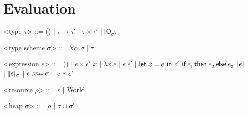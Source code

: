 \chapter{Evaluation} \label{chapter:evaluation}


\begin{grammar}

  <type $\tau$> ::= () | $\tau \rightarrow \tau'$ | $\tau \times \tau'$ | $\textsf{IO}_\sigma \tau$
  
  <type scheme $\sigma$> ::= $\forall \alpha . \sigma$ | $\tau$

  <expression $e$> ::= () | $e \times e'$
  \alt $x$ | $\lambda x . e$ | $e \ e'$ | $\mathsf{let} \ x = e \ \mathsf{in} \ e'$
  \alt $\textsf{if} \ e_1 \ \textsf{then} \ e_2 \ \textsf{else} \ e_3$
  \alt $[\![ e]\!]$ | $[\![ e]\!]_\sigma$ | $e >\!\!>\!\!= e'$ | $e \curlyvee e'$

  <resource $\rho$> ::= $r$ | \textsf{World}

  <heap $\sigma$> ::= $\rho$ | $\sigma \cup \sigma'$

\end{grammar}

